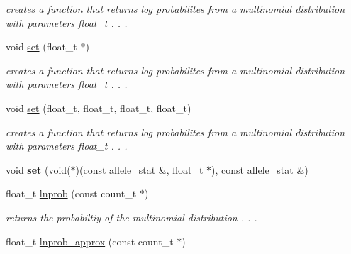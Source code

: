 \begin{DoxyCompactItemize}
\begin{DoxyCompactList}\small\item\em creates a function that returns log probabilites from a multinomial distribution with parameters float\-\_\-t . . . \end{DoxyCompactList}\item 
\hypertarget{classlnmultinomial_a91dd77fd2c1ff0dd847727a0fe839e4b}{void \hyperlink{classlnmultinomial_a91dd77fd2c1ff0dd847727a0fe839e4b}{set} (float\-\_\-t $\ast$)}\label{classlnmultinomial_a91dd77fd2c1ff0dd847727a0fe839e4b}

\begin{DoxyCompactList}\small\item\em creates a function that returns log probabilites from a multinomial distribution with parameters float\-\_\-t . . . \end{DoxyCompactList}\item 
\hypertarget{classlnmultinomial_abc759e365df6d8daca003e5ecfdfca5c}{void \hyperlink{classlnmultinomial_abc759e365df6d8daca003e5ecfdfca5c}{set} (float\-\_\-t, float\-\_\-t, float\-\_\-t, float\-\_\-t)}\label{classlnmultinomial_abc759e365df6d8daca003e5ecfdfca5c}

\begin{DoxyCompactList}\small\item\em creates a function that returns log probabilites from a multinomial distribution with parameters float\-\_\-t . . . \end{DoxyCompactList}\item 
\hypertarget{classlnmultinomial_a7532f39e8449f39a6b317b8b0cd28e4f}{void {\bfseries set} (void($\ast$)(const \hyperlink{classallele__stat}{allele\-\_\-stat} \&, float\-\_\-t $\ast$), const \hyperlink{classallele__stat}{allele\-\_\-stat} \&)}\label{classlnmultinomial_a7532f39e8449f39a6b317b8b0cd28e4f}

\item 
\hypertarget{classlnmultinomial_a97f19c05ef64d56f1f41cffb78058b9d}{float\-\_\-t \hyperlink{classlnmultinomial_a97f19c05ef64d56f1f41cffb78058b9d}{lnprob} (const count\-\_\-t $\ast$)}\label{classlnmultinomial_a97f19c05ef64d56f1f41cffb78058b9d}

\begin{DoxyCompactList}\small\item\em returns the probabiltiy of the multinomial distribution . . . \end{DoxyCompactList}\item 
\hypertarget{classlnmultinomial_af5a14d8dec973b79711a55a3a747b59e}{float\-\_\-t \hyperlink{classlnmultinomial_af5a14d8dec973b79711a55a3a747b59e}{lnprob\-\_\-approx} (const count\-\_\-t $\ast$)}\label{classlnmultinomial_af5a14d8dec973b79711a55a3a747b59e}


\end{DoxyCompactItemize}
